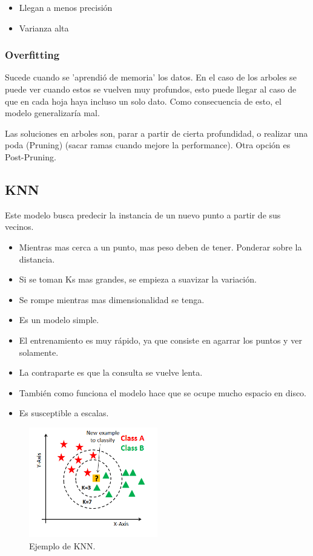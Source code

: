 \documentclass[titlepage,a4paper]{article}
\begin{document}
\begin{itemize}
    \item Llegan a menos precisión
    \item Varianza alta
\end{itemize}

\subsubsection*{Overfitting}

Sucede cuando se 'aprendió de memoria' los datos. En el caso de los arboles se puede ver cuando estos se vuelven muy profundos, esto puede llegar al caso de que en cada hoja haya incluso un solo dato. Como consecuencia de esto, el modelo generalizaría mal.

Las soluciones en arboles son, parar a partir de cierta profundidad, o realizar una poda (Pruning)  (sacar ramas cuando mejore la performance). Otra opción es Post-Pruning.

\subsection{KNN}
Este modelo busca predecir la instancia de un nuevo punto a partir de sus vecinos.

\begin{itemize}
    \item Mientras mas cerca a un punto, mas peso deben de tener. Ponderar sobre la distancia.
    \item Si se toman Ks mas grandes, se empieza a suavizar la variación.
    \item Se rompe mientras mas dimensionalidad se tenga.
    \item Es un modelo simple.
    \item El entrenamiento es muy rápido, ya que consiste en agarrar los puntos y ver solamente.
    \item La contraparte es que la consulta se vuelve lenta.
    \item También como funciona el modelo hace que se ocupe mucho espacio en disco.
    \item Es susceptible a escalas.
\end{itemize}

\begin{figure}
    \centering
    \includegraphics[width=0.5\textwidth]{imagenesResumen/KNN.png}
    \caption{Ejemplo de KNN.}
\end{figure}
\end{document}
